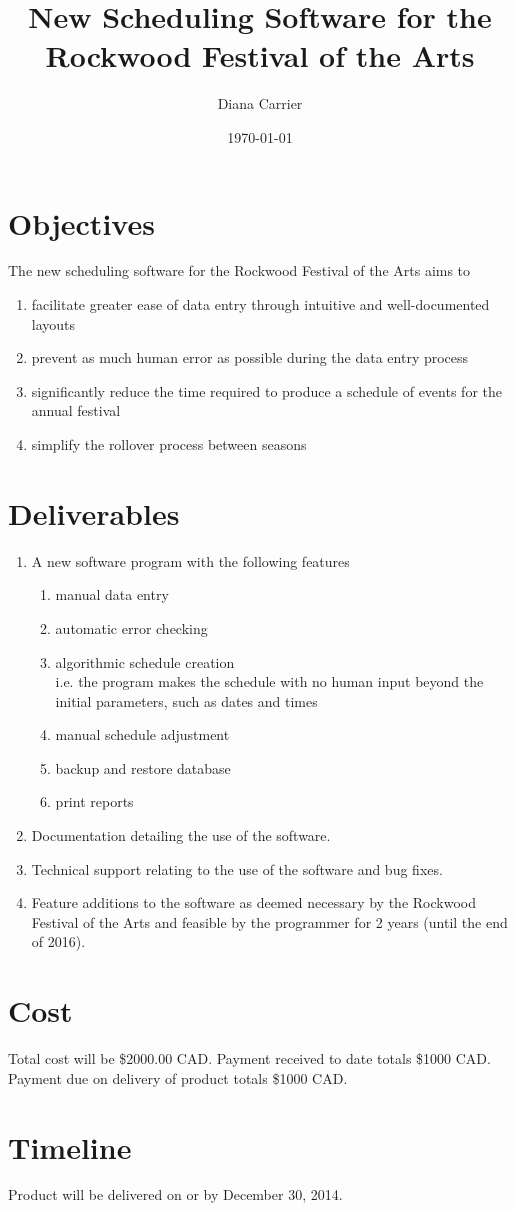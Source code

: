 \documentclass[dvips,12pt]{article}
\begin{document}
\title{New Scheduling Software for the \\Rockwood Festival of the Arts}
\author{Diana Carrier}
\date{\today}


\maketitle


\section*{Objectives}

	The new scheduling software for the Rockwood Festival of the Arts aims to
	\begin{enumerate}
		\item facilitate greater ease of data entry through intuitive and well-documented layouts
		\item prevent as much human error as possible during the data entry process
		\item significantly reduce the time required to produce a schedule of events for the annual festival
		\item simplify the rollover process between seasons
	\end{enumerate}

\section*{Deliverables}
 
	\begin{enumerate}
		\item A new software program with the following features
		\begin{enumerate}
			\item manual data entry
			\item automatic error checking
			\item algorithmic schedule creation \\
					i.e. the program makes the schedule with no human input beyond the initial parameters, such as dates and times
			\item manual schedule adjustment
			\item backup and restore database
			\item print reports
		\end{enumerate}
		\item Documentation detailing the use of the software.
		\item Technical support relating to the use of the software and bug fixes.
		\item Feature additions to the software as deemed necessary by the Rockwood Festival of the Arts and feasible by the programmer for 2 years (until the end of 2016).
	\end{enumerate}

\section*{Cost}

	Total cost will be \$2000.00 CAD. Payment received to date totals \$1000 CAD. Payment due on delivery of product totals \$1000 CAD.

\section*{Timeline}

	Product will be delivered on or by December 30, 2014.
\end{document}
